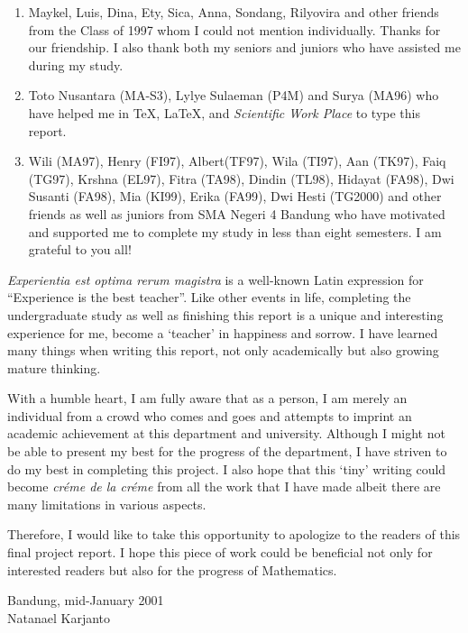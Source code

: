 \documentclass[12pt,a4paper]{report}
\begin{document}
\begin{enumerate}[leftmargin=1.2em]
\item Maykel, Luis, Dina, Ety, Sica, Anna, Sondang, Rilyovira and other friends from the Class of 1997 whom I could not mention individually. Thanks for our friendship. I also thank both my seniors and juniors who have assisted me during my study.

\item Toto Nusantara (MA-S3), Lylye Sulaeman (P4M) and Surya (MA96) who have helped me in \TeX, \LaTeX, and \emph{Scientific Work Place} to type this report.

\item Wili (MA97), Henry (FI97), Albert(TF97), Wila (TI97), Aan (TK97), Faiq (TG97), Krshna (EL97), Fitra (TA98), Dindin (TL98), Hidayat (FA98), Dwi Susanti (FA98), Mia (KI99), Erika (FA99), Dwi Hesti (TG2000) and other friends as well as juniors from SMA Negeri 4 Bandung who have motivated and supported me to complete my study in less than eight semesters. I am grateful to you all!
\end{enumerate}

\emph{Experientia est optima rerum magistra} is a well-known Latin expression for ``Experience is the best teacher''. Like other events in life, completing the undergraduate study as well as finishing this report is a unique and interesting experience for me, become a `teacher' in happiness and sorrow. I have learned many things when writing this report, not only academically but also growing mature thinking.

With a humble heart, I am fully aware that as a person, I am merely an individual from a crowd who comes and goes and attempts to imprint an academic achievement at this department and university. Although I might not be able to present my best for the progress of the department, I have striven to do my best in completing this project. I also hope that this `tiny' writing could become \emph{cr\'eme de la cr\'eme} from all the work that I have made albeit there are many limitations in various aspects.

Therefore, I would like to take this opportunity to apologize to the readers of this final project report. I hope this piece of work could be beneficial not only for interested readers but also for the progress of Mathematics.
\begin{flushright}
Bandung, mid-January 2001 \vspace*{0.5cm}\\
{\Large \calligra Natanael Karjanto \ }
\end{flushright}
\end{document}
